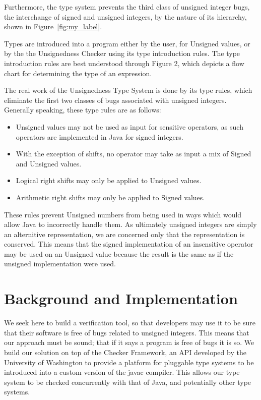 \documentclass{sigplanconf}
\begin{document}
Furthermore, the type system prevents the third class of unsigned integer bugs, the interchange of signed and unsigned integers, by the nature of its hierarchy, shown in Figure~\ref{fig:my_label}.

Types are introduced into a program either by the user, for Unsigned values, or by the the Unsignedness Checker using its type introduction rules. The type introduction rules are best understood through Figure 2, which depicts a flow chart for determining the type of an expression.


The real work of the Unsignedness Type System is done by its type rules, which eliminate the first two classes of bugs associated with unsigned integers. Generally speaking, these type rules are as follows:

\begin{itemize}
  \item Unsigned values may not be used as input for sensitive operators, as such operators are implemented in Java for signed integers.
  \item With the exception of shifts, no operator may take as input a mix of Signed and Unsigned values.
  \item Logical right shifts may only be applied to Unsigned values.
  \item Arithmetic right shifts may only be applied to Signed values.
\end{itemize}

These rules prevent Unsigned numbers from being used in ways which would allow Java to incorrectly handle them. As ultimately unsigned integers are simply an alternitive representation, we are concerned only that the representation is conserved. This means that the signed implementation of an insensitive operator may be used on an Unsigned value because the result is the same as if the unsigned implementation were used.

\section{Background and Implementation}


We seek here to build a verification tool, so that developers may use it to be sure that their software is free of bugs related to unsigned integers. This means that our approach must be sound; that if it says a program is free of bugs it is so. We build our solution on top of the Checker Framework, an API developed by the University of Washington to provide a platform for pluggable type systems to be introduced into a custom version of the javac compiler. This allows our type system to be checked concurrently with that of Java, and potentially other type systems.
\end{document}
